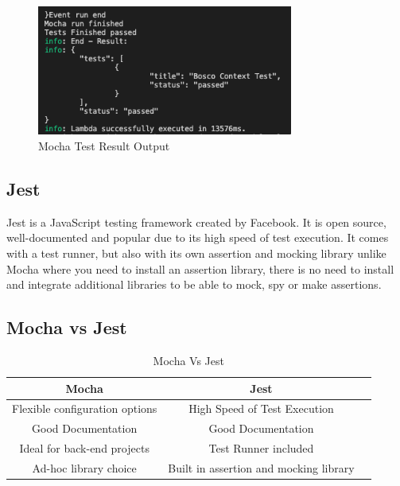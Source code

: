 \documentclass[12pt,a4paper,titlepage]{report}
\begin{document}
\begin{figure}[ht]
 \centering
 \includegraphics[width=0.75\textwidth,height=0.75\textwidth,keepaspectratio]{./diagrams/mocha_test_result.png}
 \caption{Mocha Test Result Output}
\end{figure}

\subsection{Jest}

Jest is a JavaScript testing framework created by Facebook. It is open source, well-documented and popular due to its
high speed of test execution. It comes with a test runner, but also with its own assertion and mocking library unlike Mocha where you need to install an assertion
library, there is no need to install and integrate additional libraries to be able to mock, spy or make assertions.

\subsection{Mocha vs Jest}

\begin{table}[ht]
 \centering
 \small
 \setlength\tabcolsep{6pt}
 \begin{tabular}{|c|c|c}
  \hline \textbf
  {Mocha}       & \textbf {Jest}\\
  \hline\hline
  Flexible configuration options & High Speed of Test Execution\\
  \hline
  Good Documentation       & Good Documentation\\
  \hline
  Ideal for back-end projects  & Test Runner included\\
  \hline
  Ad-hoc library choice     & Built in assertion and mocking library\\
  \hline
 \end{tabular}
 \caption{Mocha Vs Jest}
\label{table:mocha:jest}
\end{table}
\end{document}
